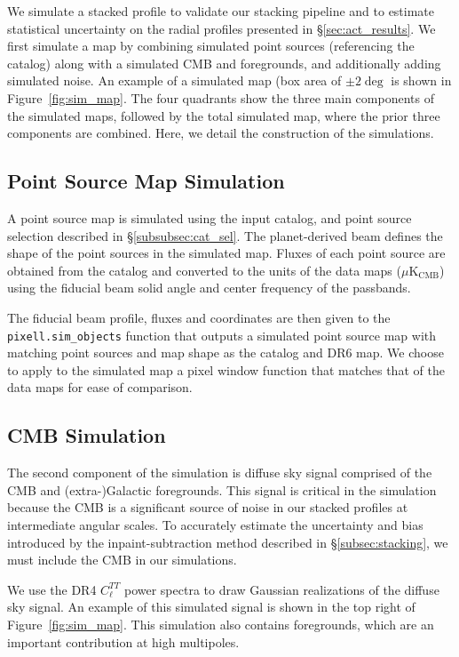We simulate a stacked profile to validate our stacking pipeline and to estimate statistical uncertainty on the radial profiles presented in \S\ref{sec:act_results}.  We first simulate a map by combining simulated point sources (referencing the catalog) along with a simulated CMB and foregrounds, and additionally adding simulated noise.  An example of a simulated map (box area of $\pm2\deg$ is shown in Figure~\ref{fig:sim_map}.  The four quadrants show the three main components of the simulated maps, followed by the total simulated map, where the prior three components are combined.  Here, we detail the construction of the simulations.

\subsection{Point Source Map Simulation}
\label{subsec:sim_ptsrc}
A point source map is simulated using the input catalog, and point source selection described in \S\ref{subsubsec:cat_sel}.  The planet-derived beam defines the shape of the point sources in the simulated map.  Fluxes of each point source are obtained from the catalog and converted to the units of the data maps ($\mu \text{K}_\text{CMB}$) using the fiducial beam solid angle and center frequency of the passbands.

The fiducial beam profile, fluxes and coordinates are then given to the \verb|pixell.sim_objects| function that outputs a simulated point source map with matching point sources and map shape as the catalog and DR6 map. We choose to apply to the simulated map a pixel window function that matches that of the data maps for ease of comparison.

\subsection{CMB Simulation}
\label{subsec:sim_cmb}
The second component of the simulation is diffuse sky signal comprised of the CMB and (extra-)Galactic foregrounds.  This signal is critical in the simulation because the CMB is a significant source of noise in our stacked profiles at intermediate angular scales.  To accurately estimate the uncertainty and bias introduced by the inpaint-subtraction method described in \S\ref{subsec:stacking}, we must include the CMB in our simulations.

We use the DR4 $C_\ell^{TT}$ power spectra to draw Gaussian realizations of the diffuse sky signal. An example of this simulated signal is shown in the top right of Figure~\ref{fig:sim_map}.  This simulation also contains foregrounds, which are an important contribution at high multipoles.

